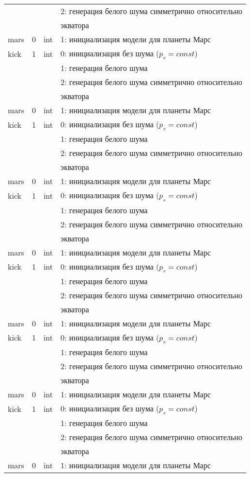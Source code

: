 \begin{longtable*}[c]{|l|c|l|l|}
    &   &     & 2: генерация белого шума симметрично относительно \\
    & & & экватора    \\
    mars & 0 & int & 1: инициализация модели для планеты Марс     \\
    kick & 1 & int & 0: инициализация без шума (\(p_s = const\)) \\
    &   &     & 1: генерация белого шума                  \\
    &   &     & 2: генерация белого шума симметрично относительно \\
    & & & экватора    \\
    mars & 0 & int & 1: инициализация модели для планеты Марс     \\
    kick & 1 & int & 0: инициализация без шума (\(p_s = const\)) \\
    &   &     & 1: генерация белого шума                  \\
    &   &     & 2: генерация белого шума симметрично относительно \\
    & & & экватора    \\
    mars & 0 & int & 1: инициализация модели для планеты Марс     \\
    kick & 1 & int & 0: инициализация без шума (\(p_s = const\)) \\
    &   &     & 1: генерация белого шума                  \\
    &   &     & 2: генерация белого шума симметрично относительно \\
    & & & экватора    \\
    mars & 0 & int & 1: инициализация модели для планеты Марс     \\
    kick & 1 & int & 0: инициализация без шума (\(p_s = const\)) \\
    &   &     & 1: генерация белого шума                  \\
    &   &     & 2: генерация белого шума симметрично относительно \\
    & & & экватора    \\
    mars & 0 & int & 1: инициализация модели для планеты Марс     \\
    kick & 1 & int & 0: инициализация без шума (\(p_s = const\)) \\
    &   &     & 1: генерация белого шума                  \\
    &   &     & 2: генерация белого шума симметрично относительно \\
    & & & экватора    \\
    mars & 0 & int & 1: инициализация модели для планеты Марс     \\
    kick & 1 & int & 0: инициализация без шума (\(p_s = const\)) \\
    &   &     & 1: генерация белого шума                  \\
    &   &     & 2: генерация белого шума симметрично относительно \\
    & & & экватора    \\
    mars & 0 & int & 1: инициализация модели для планеты Марс     \\
    \hline
\end{longtable*}

